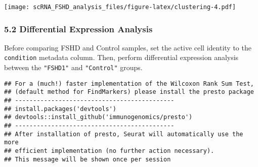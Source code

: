 \documentclass[
]{article}
\newenvironment{Shaded}{\begin{snugshade}}{\end{snugshade}}
\newcommand{\AttributeTok}[1]{\textcolor[rgb]{0.13,0.29,0.53}{#1}}
\newcommand{\CommentTok}[1]{\textcolor[rgb]{0.56,0.35,0.01}{\textit{#1}}}
\newcommand{\ConstantTok}[1]{\textcolor[rgb]{0.56,0.35,0.01}{#1}}
\newcommand{\FunctionTok}[1]{\textcolor[rgb]{0.13,0.29,0.53}{\textbf{#1}}}
\newcommand{\NormalTok}[1]{#1}
\newcommand{\OtherTok}[1]{\textcolor[rgb]{0.56,0.35,0.01}{#1}}
\newcommand{\SpecialCharTok}[1]{\textcolor[rgb]{0.81,0.36,0.00}{\textbf{#1}}}
\newcommand{\StringTok}[1]{\textcolor[rgb]{0.31,0.60,0.02}{#1}}
\begin{document}
\texttt{[image: scRNA\_FSHD\_analysis\_files/figure-latex/clustering-4.pdf]}

\subsubsection{5.2 Differential Expression
Analysis}\label{differential-expression-analysis}

Before comparing FSHD and Control samples, set the active cell identity
to the \texttt{condition} metadata column. Then, perform differential
expression analysis between the \texttt{"FSHD1"} and \texttt{"Control"}
groups.

\begin{Shaded}
\end{Shaded}

\begin{verbatim}
## For a (much!) faster implementation of the Wilcoxon Rank Sum Test,
## (default method for FindMarkers) please install the presto package
## --------------------------------------------
## install.packages('devtools')
## devtools::install_github('immunogenomics/presto')
## --------------------------------------------
## After installation of presto, Seurat will automatically use the more 
## efficient implementation (no further action necessary).
## This message will be shown once per session
\end{verbatim}
\end{document}

